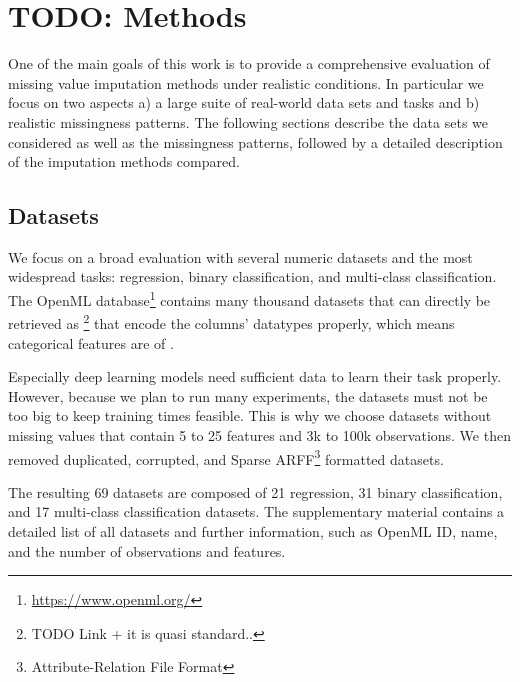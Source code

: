 
\section{TODO: Methods}
%
One of the main goals of this work is to provide a comprehensive evaluation of missing value imputation methods under realistic conditions. In particular we focus on two aspects a) a large suite of real-world data sets and tasks and b) realistic missingness patterns. The following sections describe the data sets we considered as well as the missingness patterns, followed by a detailed description of the imputation methods compared.

\subsection{Datasets}
%
We focus on a broad evaluation with several numeric datasets and the most widespread tasks: regression, binary classification, and multi-class classification. The OpenML database\footnote{\url{https://www.openml.org/}} contains many thousand datasets that can directly be retrieved as \footnote{TODO Link + it is quasi standard..} that encode the columns' datatypes properly, which means categorical features are of  .

Especially deep learning models need sufficient data to learn their task properly. However, because we plan to run many experiments, the datasets must not be too big to keep training times feasible. This is why we choose datasets without missing values that contain 5 to 25 features and 3k to 100k observations. We then removed duplicated, corrupted, and Sparse ARFF\footnote{Attribute-Relation File Format} formatted datasets.

The resulting 69 datasets are composed of 21 regression, 31 binary classification, and 17 multi-class classification datasets. The supplementary material contains a detailed list of all datasets and further information, such as OpenML ID, name, and the number of observations and features.


